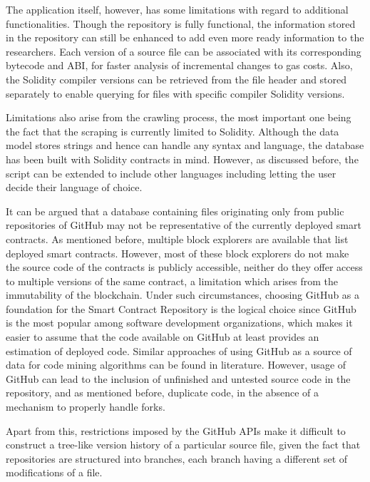 \documentclass[10pt,conference]{IEEEtran}
\begin{document}
	The application itself, however, has some limitations with regard to additional functionalities. Though the repository is fully functional, the information stored in the repository can still be enhanced to add even more ready information to the researchers. Each version of a source file can be associated with its corresponding bytecode and ABI, for faster analysis of incremental changes to gas costs. Also, the Solidity compiler versions can be retrieved from the file header and stored separately to enable querying for files with specific compiler Solidity versions.
	
	Limitations also arise from the crawling process, the most important one being the fact that the scraping is currently limited to Solidity. Although the data model stores strings and hence can handle any syntax and language, the database has been built with Solidity contracts in mind. However, as discussed before, the script can be extended to include other languages including letting the user decide their language of choice.
	
	It can be argued that a database containing files originating only from public repositories of GitHub may not be representative of the currently deployed smart contracts. As mentioned before, multiple block explorers are available that list deployed smart contracts. However, most of these block explorers do not make the source code of the contracts is publicly accessible, neither do they offer access to multiple versions of the same contract, a limitation which arises from the immutability of the blockchain. Under such circumstances, choosing GitHub as a foundation for the Smart Contract Repository is the logical choice since GitHub is the most popular among software development organizations, which makes it easier to assume that the code available on GitHub at least provides an estimation of deployed code. Similar approaches of using GitHub as a source of data for code mining algorithms can be found in literature\cite{schroder, dabic, yang}. However, usage of GitHub can lead to the inclusion of unfinished and untested source code in the repository, and as mentioned before, duplicate code, in the absence of a mechanism to properly handle forks. 
	
	Apart from this, restrictions imposed by the GitHub APIs make it difficult to construct a tree-like version history of a particular source file, given the fact that repositories are structured into branches, each branch having a different set of modifications of a file. 
	
\end{document}
